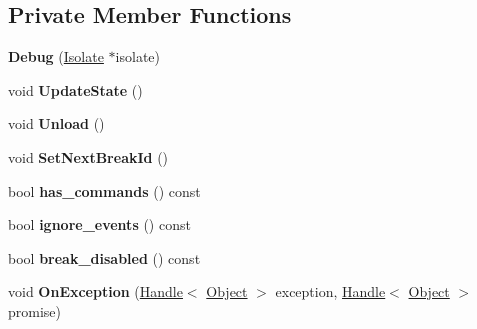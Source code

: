 \subsection*{Private Member Functions}
\begin{DoxyCompactItemize}
\item 
{\bfseries Debug} (\hyperlink{classv8_1_1internal_1_1_isolate}{Isolate} $\ast$isolate)\hypertarget{classv8_1_1internal_1_1_debug_af60ce1fedcea1f0ce6dbf04ec0d268d9}{}\label{classv8_1_1internal_1_1_debug_af60ce1fedcea1f0ce6dbf04ec0d268d9}

\item 
void {\bfseries Update\+State} ()\hypertarget{classv8_1_1internal_1_1_debug_a0af073e83729d8eb34106711d01f6354}{}\label{classv8_1_1internal_1_1_debug_a0af073e83729d8eb34106711d01f6354}

\item 
void {\bfseries Unload} ()\hypertarget{classv8_1_1internal_1_1_debug_a15b07548b0601b150cec8c0d399c032e}{}\label{classv8_1_1internal_1_1_debug_a15b07548b0601b150cec8c0d399c032e}

\item 
void {\bfseries Set\+Next\+Break\+Id} ()\hypertarget{classv8_1_1internal_1_1_debug_a2203cf16e9a4e636f4d2f226126b214f}{}\label{classv8_1_1internal_1_1_debug_a2203cf16e9a4e636f4d2f226126b214f}

\item 
bool {\bfseries has\+\_\+commands} () const \hypertarget{classv8_1_1internal_1_1_debug_a7b4d080bd7718dda50369d7cae9f7da8}{}\label{classv8_1_1internal_1_1_debug_a7b4d080bd7718dda50369d7cae9f7da8}

\item 
bool {\bfseries ignore\+\_\+events} () const \hypertarget{classv8_1_1internal_1_1_debug_aceb591899330234d61bb1cd188cdb30c}{}\label{classv8_1_1internal_1_1_debug_aceb591899330234d61bb1cd188cdb30c}

\item 
bool {\bfseries break\+\_\+disabled} () const \hypertarget{classv8_1_1internal_1_1_debug_a9b6b5e4233625f81adb1e387afa492aa}{}\label{classv8_1_1internal_1_1_debug_a9b6b5e4233625f81adb1e387afa492aa}

\item 
void {\bfseries On\+Exception} (\hyperlink{classv8_1_1internal_1_1_handle}{Handle}$<$ \hyperlink{classv8_1_1internal_1_1_object}{Object} $>$ exception, \hyperlink{classv8_1_1internal_1_1_handle}{Handle}$<$ \hyperlink{classv8_1_1internal_1_1_object}{Object} $>$ promise)\hypertarget{classv8_1_1internal_1_1_debug_a99548c90d6d56f4fc0793e3ab01b821a}{}\label{classv8_1_1internal_1_1_debug_a99548c90d6d56f4fc0793e3ab01b821a}


\end{DoxyCompactItemize}
